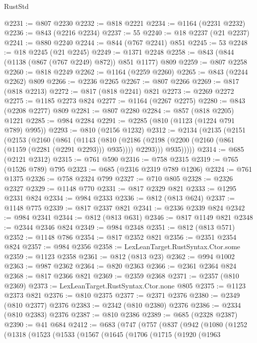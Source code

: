 \begin{lexlean}{RustStd}
\begin{coremodule}
@2231 := @807 @2230
@2232 := @818 @2221
@2234 := @1164 (@2231 @2232)
@2236 := @843 (@2216 @2234)
@2237 := 55
@2240 := @18 @2237 (@21 @2237)
@2241 := @880 @2240
@2244 := @844 (@767 @2241) @851
@2245 := 53
@2248 := @18 @2245 (@21 @2245)
@2249 := @1371 @2248
@2258 := @843 (@844 (@1138 (@867 (@767 @2249) @872)) @851 @1177) @809
@2259 := @807 @2258
@2260 := @818 @2249
@2262 := @1164 (@2259 @2260)
@2265 := @843 (@2244 @2262) @809
@2266 := @2236 @2265
@2267 := @807 @2266
@2269 := @817 (@818 @2213)
@2272 := @817 (@818 @2241) @821
@2273 := @2269 @2272
@2275 := @1185 @2273 @824
@2277 := @1164 (@2267 @2275)
@2280 := @843 (@2208 @2277) @809
@2281 := @807 @2280
@2284 := @857 (@818 @2205) @1221
@2285 := @984 @2284
@2291 := @2285 (@810 (@1123 (@1224 @791 @789) @995))
@2293 := @810 (@2156 @1232)
@2312 := @2134
    (@2135
      (@2151
        (@2153
          (@2160
            (@861
              (@1143
                (@810
                  (@2186 (@2198 (@2200 (@2160 (@861 (@1159 (@2281 (@2291 @2293))) @935)))) @2293)))
              @935)))))
@2314 := @685 (@2121 @2312)
@2315 := @761 @590
@2316 := @758 @2315
@2319 := @765 (@1526 @789) @795
@2323 := @685 (@2316 @2319 @789 @1206)
@2324 := @761 @1375
@2326 := @758 @2324 @799
@2327 := @710 @805
@2328 := @2326 @2327
@2329 := @1148 @770
@2331 := @817 @2329 @821
@2333 := @1295 @2331 @824
@2334 := @984 @2333
@2336 := @812 (@813 @624)
@2337 := @1148 @775
@2339 := @817 @2337 @821
@2341 := @2336 @2339 @824
@2342 := @984 @2341
@2344 := @812 (@813 @631)
@2346 := @817 @1149 @821
@2348 := @2344 @2346 @824
@2349 := @984 @2348
@2351 := @812 (@813 @571)
@2352 := @1148 @786
@2354 := @817 @2352 @821
@2356 := @2351 @2354 @824
@2357 := @984 @2356
@2358 := LexLeanTarget.RustSyntax.Ctor.some
@2359 := @1123 @2358
@2361 := @812 (@813 @23)
@2362 := @994 @1002
@2363 := @987 @2362
@2364 := @820 @2363
@2366 := @2361 @2364 @824
@2368 := @817 @2366 @821
@2369 := @2359 @2368
@2371 := @2357 (@810 @2369)
@2373 := LexLeanTarget.RustSyntax.Ctor.none @805
@2375 := @1123 @2373 @821
@2376 := @810 @2375
@2377 := @2371 @2376
@2380 := @2349 (@810 @2377) @2376
@2383 := @2342 (@810 @2380) @2376
@2386 := @2334 (@810 @2383) @2376
@2387 := @810 @2386
@2389 := @685 (@2328 @2387)
@2390 := @41 @684
@2412 := @683
    (@747
      (@757
        (@837
          (@942
            (@1080
              (@1252
                (@1318
                  (@1523
                    (@1533
                      (@1567
                        (@1645
                          (@1706
                            (@1715
                              (@1920
                                (@1963

\end{coremodule}
\end{lexlean}
